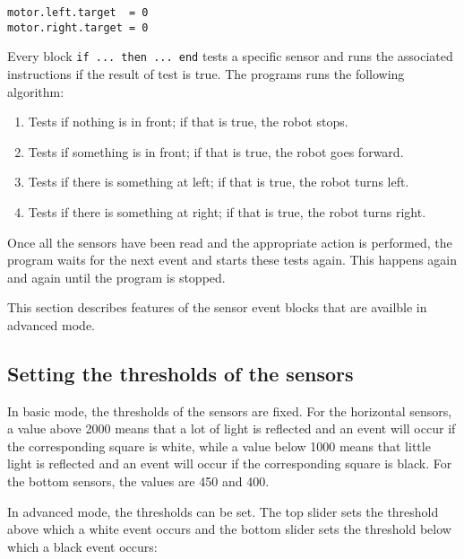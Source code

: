 \begin{footnotesize}
\begin{verbatim}
motor.left.target  = 0
motor.right.target = 0
\end{verbatim}
\end{footnotesize}

Every block \verb+if ... then ... end+ tests a specific sensor and runs
the associated instructions if the result of test is true. The programs
runs the following algorithm:

\begin{enumerate}[start=0,noitemsep,nosep]
\item Tests if nothing is in front; if that is true, the robot stops.
\item Tests if something is in front; if that is true, the robot goes forward.
\item Tests if there is something at left; if that is true, the robot turns left.
\item Tests if there is something at right; if that is true, the robot turns right.
\end{enumerate}

Once all the sensors have been read and the appropriate action is
performed, the program waits for the next event  and starts
these tests again. This happens again and again until the program is
stopped.





This section describes features of the sensor event blocks that are
availble in advanced mode.

\subsection*{Setting the thresholds of the sensors}

In basic mode, the thresholds of the sensors are fixed. For the
horizontal sensors, a value above 2000 means that a lot of light is
reflected and an event will occur if the corresponding square is white,
while a value below 1000 means that little light is reflected and an
event will occur if the corresponding square is black. For the bottom
sensors, the values are 450 and 400.

In advanced mode, the thresholds can be set. The top slider sets the
threshold above which a white event occurs and the bottom slider sets
the threshold below which a black event
occurs:\label{p.proximity-sensitivity}

